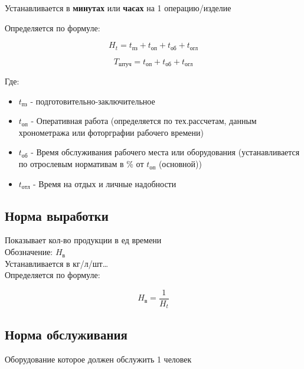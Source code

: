 \documentclass[11pt]{article}
\begin{document}
Устанавливается в \textbf{минутах} или \textbf{часах} на 1 операцию/изделие

Определяется по формуле:

\begin{equation}
  H_{t} = t_{\text{пз}} + t_{\text{оп}} + t_{\text{об}} + t_{\text{огл}}
\end{equation}

\begin{equation}
  T_{\text{штуч}} = t_{\text{оп}} + t_{\text{об}} + t_{\text{огл}}
\end{equation}

Где:

\begin{itemize}
\item \(t_{\text{пз}}\) - подготовительно-заключительное
\item \(t_{\text{оп}}\) - Оперативная работа (определяется по тех.рассчетам, данным хронометража или фоторграфии рабочего времени)
\item \(t_{\text{об}}\) - Время обслуживания рабочего места или оборудования (устанавливается по отрослевым нормативам в \% от \(t_{оп}\) (основной))
\item \(t_{\text{отл}}\) - Время на отдых и личные надобности
\end{itemize}

\subsection{Норма выработки}
\label{sec:org2c67af5}

Показывает кол-во продукции в ед времени \\

Обозначение: \(H_{\text{в}}\) \\

Устанавливается в кг/л/шт\ldots{} \\

Определяется по формуле:

\begin{equation}
  H_{\text{в}} = \frac{1}{H_{t}}
\end{equation}

\subsection{Норма обслуживания}
\label{sec:orge8176e6}

Оборудование которое должен обслужить 1 человек \\
\end{document}
